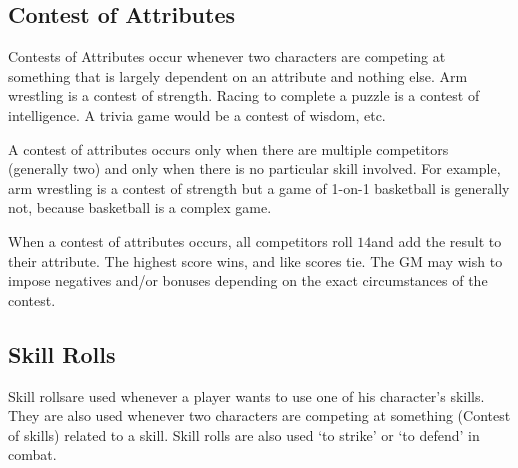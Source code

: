 \documentclass[twoside]{book}
\begin{document}
  
    

\subsection{Contest of Attributes}
    
    {  
    Contests of Attributes occur whenever two characters
               are competing at something that is largely dependent on an
               attribute and nothing else. Arm wrestling is a contest of
               strength. Racing to complete a puzzle is a contest of
               intelligence. A trivia game would be a contest of wisdom,
               etc. 
    }
  
    {  
    A contest of attributes occurs only when there are
               multiple competitors (generally two) and only when there
               is no particular skill involved. For example, arm
               wrestling is a contest of strength but a game of 1-on-1
               basketball is generally not, because basketball is a
               complex game. 
    }
  
    {  
    When a contest of attributes occurs, all competitors
               roll \ensuremath{1}\ensuremath{4}\ensuremath{}and add the result to their attribute. The
               highest score wins, and like scores tie. The GM may wish
               to impose negatives and/or bonuses depending on the exact
               circumstances of the contest. 
    }
  
  

  

  
    

\subsection{Skill Rolls}
    
    {  
    Skill rollsare used whenever a player wants to use
               one of his character's skills. They are also used
               whenever two characters are competing at something
               (Contest of skills) related to a skill. Skill rolls are
               also used `to strike' or `to
               defend' in combat. 
    }
  
\end{document}
